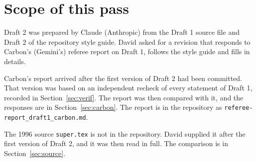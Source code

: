 \documentclass[12pt,letterpaper]{article}
\begin{document}
\section{Scope of this pass}
Draft 2 was prepared by Claude (Anthropic) from the Draft 1 source file and Draft 2 of the repository style guide. David asked for a revision that responds to Carbon's (Gemini's) referee report on Draft 1, follows the style guide and fills in details.

Carbon's report arrived after the first version of Draft 2 had been committed. That version was based on an independent recheck of every statement of Draft 1, recorded in Section~\ref{sec:verif}. The report was then compared with it, and the responses are in Section~\ref{sec:carbon}. The report is in the repository as \texttt{referee-report\_draft1\_carbon.md}.

The 1996 source \texttt{super.tex} is not in the repository. David supplied it after the first version of Draft 2, and it was then read in full. The comparison is in Section~\ref{sec:source}.
\end{document}
